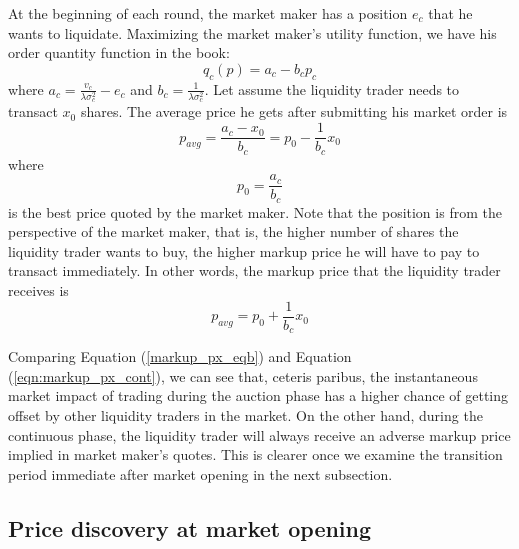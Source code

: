 At the beginning of each round, the market maker has a position $e_c$ that he wants to liquidate. Maximizing the market maker's utility function, we have his order quantity function in the book:
\begin{equation}\label{eqn:mm_eval_cont}
  q_c(p) = a_c - b_c p_c
\end{equation}
where $a_c = \frac{v_c}{\lambda \sigma_c^2} - e_c$ and $b_c=\frac{1}{\lambda \sigma_c^2}$. Let assume the liquidity trader needs to transact $x_0$ shares. The average price he gets after submitting his market order is
\[
  p_{avg} = \frac{a_c-x_0}{b_c}=p_0 - \frac{1}{b_c} x_0
\]
where
\[
  p_0 = \frac{a_c}{b_c}
\]
is the best price quoted by the market maker. Note that the position is from the perspective of the market maker, that is, the higher number of shares the liquidity trader wants to buy, the higher markup price he will have to pay to transact immediately. In other words, the markup price that the liquidity trader receives is
\begin{equation}\label{eqn:markup_px_cont}
  p_{avg} = p_0 + \frac{1}{b_c} x_0
\end{equation}

Comparing Equation (\ref{markup_px_eqb}) and Equation (\ref{eqn:markup_px_cont}), we can see that, ceteris paribus, the instantaneous market impact of trading during the auction phase has a higher chance of getting offset by other liquidity traders in the market. On the other hand, during the continuous phase, the liquidity trader will always receive an adverse markup price implied in market maker's quotes. This is clearer once we examine the transition period immediate after market opening in the next subsection.

\subsection{Price discovery at market opening}\label{subsec:AnalyticalFrameworkTransitionPeriod}

